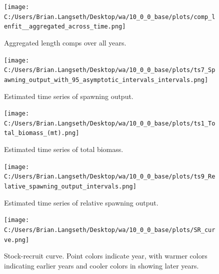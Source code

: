 \documentclass[11pt,
  english,
  a4paper,
]{article}
\begin{document}
\tagmcend\tagstructend


\begin{figure}
\centering
\texttt{[image: C:/Users/Brian.Langseth/Desktop/wa/10\_0\_0\_base/plots/comp\_lenfit\_\_aggregated\_across\_time.png]}
\caption{Aggregated length comps over all years.\label{fig:agg-len-fit}}
\end{figure}

\tagmcend\tagstructend


\begin{figure}
\centering
\texttt{[image: C:/Users/Brian.Langseth/Desktop/wa/10\_0\_0\_base/plots/ts7\_Spawning\_output\_with\_95\_asymptotic\_intervals\_intervals.png]}
\caption{Estimated time series of spawning output.\label{fig:ssb}}
\end{figure}

\tagmcend\tagstructend


\begin{figure}
\centering
\texttt{[image: C:/Users/Brian.Langseth/Desktop/wa/10\_0\_0\_base/plots/ts1\_Total\_biomass\_(mt).png]}
\caption{Estimated time series of total biomass.\label{fig:tot-bio}}
\end{figure}

\tagmcend\tagstructend


\begin{figure}
\centering
\texttt{[image: C:/Users/Brian.Langseth/Desktop/wa/10\_0\_0\_base/plots/ts9\_Relative\_spawning\_output\_intervals.png]}
\caption{Estimated time series of relative spawning output.\label{fig:depl}}
\end{figure}

\tagmcend\tagstructend


\begin{figure}
\centering
\texttt{[image: C:/Users/Brian.Langseth/Desktop/wa/10\_0\_0\_base/plots/SR\_curve.png]}
\caption{Stock-recruit curve. Point colors indicate year, with warmer colors indicating earlier years and cooler colors in showing later years.\label{fig:bh-curve}}
\end{figure}
\end{document}
